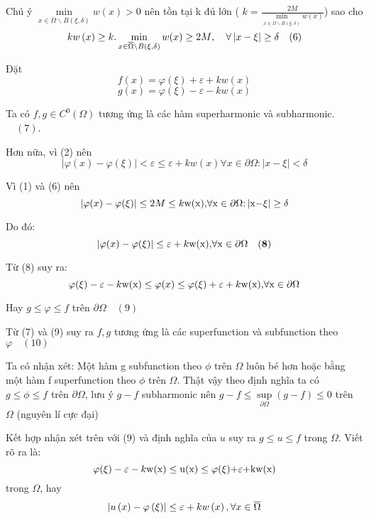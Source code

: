 Chú ý $\mathop {\min }\limits_{x\in\overline \Omega  \backslash B\left( {\xi ,\delta } \right)} w(x)>0$ nên tồn tại k đủ lớn ( $k = \frac{{2M}}{{\mathop {\min }\limits_{x\in\overline \Omega  \backslash B\left( {\xi ,\delta } \right)} w(x)}}$)
sao cho $$kw\left( x \right) \ge k.\mathop {\min }\limits_{x\in\overline \Omega  \backslash B\left( {\xi ,\delta } \right)} w(x)\ge 2M{\rm{ }}, \quad\forall \left| {x - \xi } \right| \ge \delta \quad (6)$$

Đặt
\[f\left( x \right) = \varphi \left( \xi  \right) + \varepsilon  + kw\left( x \right) \] 
\[g\left( x \right) = \varphi \left( \xi  \right) - \varepsilon  - kw\left( x \right) \] 

Ta có $f,g \in {C^0}\left( \Omega  \right)$ tương ứng là các hàm superharmonic và subharmonic. $\quad (7)$.

Hơn nữa, vì (2) nên $$\left| {\varphi \left( x \right) - \varphi \left( \xi  \right)} \right| < \varepsilon\le \varepsilon+kw(x)  \forall x \in \partial \Omega:\left| {x - \xi } \right| < \delta $$

Vì (1) và (6) nên $$\left| { \varphi (x)-\varphi (\xi ) } \right| \le 2M \le k{\rm{w(x),}}\forall {\rm{x}} \in \partial \Omega {\rm{:}}\left| {{\rm{x - }}\xi } \right| \ge \delta $$

Do đó: 
\[
\left| {\varphi (x)-\varphi (\xi ) } \right| \le \varepsilon  + k{\rm{w(x),}}\forall {\rm{x}} \in \partial \Omega \quad {\bf (8)}
\]

Từ (8) suy ra:  \[
\varphi (\xi ) - \varepsilon  - k{\rm{w(x)}} \le \varphi (x) \le \varphi (\xi ) + \varepsilon  + k{\rm{w(x),}}\forall {\rm{x}} \in \partial \Omega 
\]

Hay $g \le \varphi  \le f$  trên $\partial \Omega \quad (9)$

Từ (7) và (9) suy ra $f,g$ tương ứng là các superfunction và subfunction theo $\varphi \quad (10)$

Ta có nhận xét: Một hàm g subfunction theo $\phi$ trên $\Omega$ luôn bé hơn hoặc bằng một hàm f superfunction theo $\phi$ trên $\Omega$. Thật vậy theo định nghĩa ta có $g\le \phi \le f$ trên $\partial \Omega$, lưu ý $g-f$ subharmonic nên $g-f\le \mathop {\sup}\limits_{\partial \Omega } (g -f) \le 0$ trên $\Omega$ (nguyên lí cực đại)

Kết hợp nhận xét trên với (9) và định nghĩa của $u$ suy ra $g \le u \le f$ trong $\Omega$. Viết rõ ra là:
\[
\varphi (\xi ) - \varepsilon  - k{\rm{w(x)}} \le {\rm{u(x)}} \le \varphi {\rm{(}}\xi {\rm{) + }}\varepsilon {\rm{ + kw(x)}}
\]
trong $\Omega$, hay
\[\left| {u\left( x \right) - \varphi \left( \xi  \right)} \right| \le \varepsilon  + kw\left( x \right){\rm{ }},\forall x \in \overline \Omega  \]


